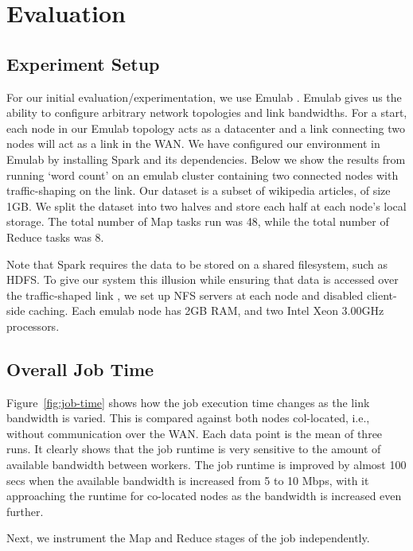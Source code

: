 \section{Evaluation}

\subsection{Experiment Setup}
For our initial evaluation/experimentation, we use Emulab \cite{emulab}. Emulab gives us the ability to configure arbitrary network topologies and link bandwidths. For a start, each node in our Emulab topology acts as a datacenter and a link connecting two nodes will act as a link in the WAN. We have configured our environment in Emulab by installing Spark and its dependencies.  Below we show the results from running `word count' on an emulab cluster containing two connected nodes with traffic-shaping on the link. Our dataset is a subset of wikipedia articles, of size 1GB. We split the dataset into two halves and store each half at each node's local storage. The total number of Map tasks run was 48, while the total number of Reduce tasks was 8. 

Note that Spark requires the data to be stored on a shared filesystem, such as HDFS. To give our system this illusion while ensuring that data is accessed over the traffic-shaped link , we set up NFS servers at each node and disabled client-side caching. Each emulab node has 2GB RAM, and two Intel Xeon 3.00GHz processors.

\subsection{Overall Job Time}
Figure~\ref{fig:job-time} shows how the job execution time changes as the link bandwidth is varied. This is compared against both nodes col-located, i.e., without communication over the WAN. Each data point is the mean of three runs. It clearly shows that the job runtime is very sensitive to the amount of available bandwidth between workers. The job runtime is improved by almost 100 secs when the available bandwidth is increased from 5 to 10 Mbps, with it approaching the runtime for co-located nodes as the bandwidth is increased even further.  

Next, we instrument the Map and Reduce stages of the job independently.

